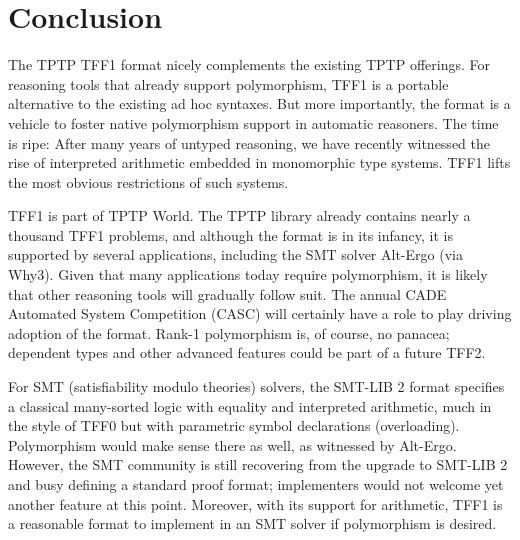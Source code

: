 \section{Conclusion}
\label{sec_concl}

The TPTP TFF1 format nicely complements the existing TPTP
offerings. %
For reasoning tools that already
support polymorphism, TFF1 is a portable alternative to the existing ad hoc
syntaxes. But more importantly, the format is a vehicle to foster native
polymorphism support in automatic reasoners.
The time is ripe: After many
years of untyped reasoning, we have recently witnessed the rise of
interpreted arithmetic embedded in monomorphic type systems. TFF1
lifts the most obvious restrictions of such systems.

TFF1 is part of TPTP World. The TPTP library already contains
nearly a thousand TFF1 problems, and although the format is in its
infancy, it is supported by several applications, including the SMT solver
Alt-Ergo (via Why3).
Given that many applications today require polymorphism, it
is likely that other reasoning tools will gradually follow suit.
The annual CADE Automated
System Competition (CASC) will certainly have a
role to play driving adoption of the format.
Rank-1 polymorphism is, of course, no panacea; dependent types and
other advanced features could be part of a future TFF2.

For SMT (satisfiability modulo theories) solvers, the SMT-LIB 2 format \cite{barrett-et-al-2010} specifies a
classical many-sorted logic with equality and interpreted arithmetic, much in
the style of TFF0 but with parametric symbol declarations (overloading).
Polymorphism would make sense there as well, as witnessed by Alt-Ergo.
However, the SMT community is still recovering from the %
upgrade to SMT-LIB 2 and busy defining a standard proof format;
implementers would %
not welcome yet another
feature at this point. Moreover, with its support for arithmetic, TFF1 is a
reasonable format to implement in an SMT solver if polymorphism is desired.

\def\ackname{Acknowledgment}
